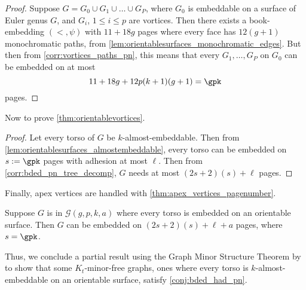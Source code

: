 \begin{proof}
	Suppose $G = G_0 \cup G_1 \cup \ldots \cup G_P$, where $G_0$ is embeddable on a surface of Euler genus $G$, and $G_i$, $1 \leq i \leq p$ are vortices. Then there exists a book-embedding $(<, \psi)$ with $11 + 18g$ pages where every face has $12(g+1)$ monochromatic paths, from \cref{lem:orientablesurfaces_monochromatic_edges}. But then from \cref{corr:vortices_paths_pn}, this means that every $G_1, \ldots, G_P$ on $G_0$ can be embedded on at most \[11 + 18g + 12p(k + 1)(g + 1) = \gpk \] pages. 
\end{proof}

Now to prove \cref{thm:orientablevortices}. 
\begin{proof}
	Let every torso of $G$ be $k$-almost-embeddable. Then from \cref{lem:orientablesurfaces_almostembeddable}, every torso can be embedded on $s := \gpk $ pages with adhesion at most $\ell$. Then from \cref{corr:bded_pn_tree_decomp}, $G$ needs at most $(2s + 2)(s) + \ell$ pages.
\end{proof}

Finally, apex vertices are handled with \cref{thm:apex_vertices_pagenumber}. 
\begin{corollary}\label{corr:orientable_surfaces_gpka}
	Suppose $G$ is in $\mathcal{G}(g, p, k, a)$ where every torso is embedded on an orientable surface. Then $G$ can be embedded on $(2s + 2)(s) + \ell + a$ pages, where $s = \gpk$. 
\end{corollary}
Thus, we conclude a partial result using the Graph Minor Structure Theorem by  \textcite{robertsonGraphMinorsXVI2003} to show that some $K_t$-minor-free graphs, ones where every torso is $k$-almost-embeddable on an orientable surface, satisfy \cref{conj:bded_had_pn}.